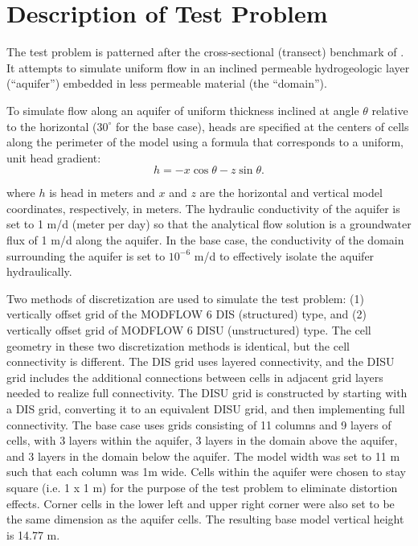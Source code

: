 \documentclass{article}
\begin{document}
\section{Description of Test Problem}

The test problem is patterned after the cross-sectional (transect) benchmark of \cite{bardot2022}. It attempts to simulate uniform flow in an inclined permeable hydrogeologic layer (``aquifer'') embedded in less permeable material (the ``domain'').

To simulate flow along an aquifer of uniform thickness inclined at angle $\theta$ relative to the horizontal ($30^{\circ}$ for the base case), heads are specified at the centers of cells along the perimeter of the model using a formula that corresponds to a uniform, unit head gradient:
\begin{equation}
\label{eqn:head_analyt_along}
h = - x \cos \theta - z \sin \theta.
\end{equation}

\noindent where $h$ is head in meters and $x$ and $z$ are the horizontal and vertical model coordinates, respectively, in meters. The hydraulic conductivity of the aquifer is set to 1 m/d (meter per day) so that the analytical flow solution is a groundwater flux of 1 m/d along the aquifer. In the base case, the conductivity of the domain surrounding the aquifer is set to $10^{-6}$ m/d to effectively isolate the aquifer hydraulically.

Two methods of discretization are used to simulate the test problem: (1) vertically offset grid of the MODFLOW 6 DIS (structured) type, and (2) vertically offset grid of MODFLOW 6 DISU (unstructured) type. The cell geometry in these two discretization methods is identical, but the cell connectivity is different. The DIS grid uses layered connectivity, and the DISU grid includes the additional connections between cells in adjacent grid layers needed to realize full connectivity. The DISU grid is constructed by starting with a DIS grid, converting it to an equivalent DISU grid, and then implementing full connectivity. The base case uses grids consisting of 11 columns and 9 layers of cells, with 3 layers within the aquifer, 3 layers in the domain above the aquifer, and 3 layers in the domain below the aquifer.  The model width was set to 11 m such that each column was 1m wide. Cells within the aquifer were chosen to stay square (i.e. 1 x 1 m) for the purpose of the test problem to eliminate distortion effects. Corner cells in the lower left and upper right corner were also set to be the same dimension as the aquifer cells. The resulting base model vertical height is 14.77 m.  
\end{document}
